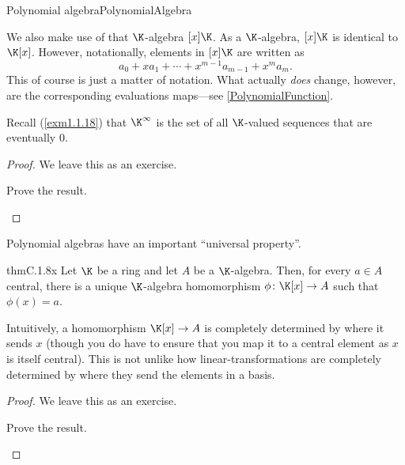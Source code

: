 \begin{prp}{Polynomial algebra}{PolynomialAlgebra}
\begin{rmk}
		We also make use of that $\K$-algebra $[x]\K$.  As a $\K$-algebra, $[x]\K$\index[notation]{$[x]\K$} is identical to $\K [x]$.  However, notationally, elements in $[x]\K$ are written as
		\begin{equation}
			a_0+xa_1+\cdots +x^{m-1}a_{m-1}+x^ma_m.
		\end{equation}
		This of course is just a matter of notation.  What actually \emph{does} change, however, are the corresponding evaluations maps---see \cref{PolynomialFunction}.
	\end{rmk}
	\begin{rmk}
		Recall (\cref{exm1.1.18}) that $\K ^{\infty}$ is the set of all $\K$-valued sequences that are eventually $0$.
	\end{rmk}
	\begin{proof}
		We leave this as an exercise.
		\begin{exr}[breakable=false]{}{}
			Prove the result.
		\end{exr}
	\end{proof}
\end{prp}

Polynomial algebras have an important ``universal property''.
\begin{thm}{}{thmC.1.8x}
	Let $\K$ be a ring and let $A$ be a $\K$-algebra.  Then, for every $a\in A$ central, there is a unique $\K$-algebra homomorphism $\phi \colon \K [x]\rightarrow A$ such that $\phi (x)=a$.
	\begin{rmk}
		Intuitively, a homomorphism $\K [x]\rightarrow A$ is completely determined by where it sends $x$ (though you do have to ensure that you map it to a central element as $x$ is itself central).  This is not unlike how linear-transformations are completely determined by where they send the elements in a basis.
	\end{rmk}
	\begin{proof}
		We leave this as an exercise.
		\begin{exr}[breakable=false]{}{}
			Prove the result.
		\end{exr}
	\end{proof}
\end{thm}


